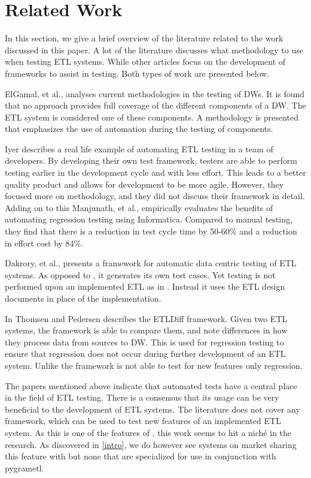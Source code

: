 \section{Related Work}\label{sect:RelatedWork}
In this section, we give a brief overview of the literature related to the work discussed in this paper. A lot of the literature discusses what methodology to use when testing ETL systems. While other articles focus on the development of frameworks to assist in testing. Both types of work are presented below.

ElGamal, et al., \cite{elgamal2012towards} analyses current methodologies in the testing of DWs. It is found that no approach provides full coverage of the different components of a DW. The ETL system is considered one of these components. A methodology is presented that emphasizes the use of automation during the testing of components.

Iyer \cite{subuiyer2014} describes a real life example of automating ETL testing in a team of developers. By developing their own test framework, testers are able to perform testing earlier in the development cycle and with less effort. This leads to a better quality product and allows for development to be more agile. However, they focused more on methodology, and they did not discuss their framework in detail. Adding on to this Manjunath, et al., \cite{manjunath2012case} empirically evaluates the benefits of automating regression testing using Informatica. Compared to manual testing, they find that there is a reduction in test cycle time by 50-60\% and a reduction in effort cost by 84\%.

Dakrory, et al., \cite{dakroryautomated} presents a framework for automatic data centric testing of ETL systems. As opposed to \FW{}, it generates its own test cases. Yet testing is not performed upon an implemented ETL as in \FW{}. Instead it uses the ETL design documents in place of the implementation.

In \cite{thomsen2006etldiff} Thomsen and Pedersen describes the ETLDiff framework. Given two ETL systems, the framework is able to compare them, and note differences in how they process data from sources to DW. This is used for regression testing to ensure that regression does not occur during further development of an ETL system. Unlike \FW{} the framework is not able to test for new features only regression.

The papers mentioned above indicate that automated tests have a central place in the field of ETL testing. There is a consensus that its usage can be very beneficial to the development of ETL systems. The literature does not cover any framework, which can be used to test new features of an implemented ETL system. As this is one of the features of \FW{}, this work seems to hit a niché in the research. As discovered in \cref{intro}, we do however see systems on market sharing this feature with \FW{} but none that are specialized for use in conjunction with pygrametl.